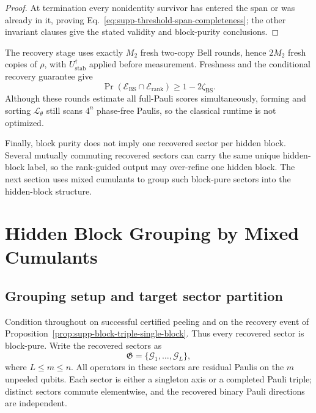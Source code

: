 \documentclass[
  aps,
  prx,
  reprint,
  superscriptaddress,
  amsmath,
  amssymb,
  nofootinbib,
  longbibliography
]{revtex4-2}
\begin{document}
\begin{proof}
At termination every nonidentity survivor has entered the span or was already
in it, proving Eq.~\eqref{eq:supp-threshold-span-completeness}; the other
invariant clauses give the stated validity and block-purity conclusions.
\end{proof}




The recovery stage uses exactly $M_2$ fresh two-copy Bell rounds, hence
$2M_2$ fresh copies of $\rho$, with $U_{\mathrm{stab}}^\dagger$ applied
before measurement.  Freshness and the conditional recovery guarantee give
\begin{equation}
\Pr(\mathcal E_{\mathrm{BS}}\cap\mathcal E_{\mathrm{rank}})
\ge
1-2\zeta_{\mathrm{BS}}.
\end{equation}
Although these rounds estimate all full-Pauli scores simultaneously,
forming and sorting $\mathcal L_\theta$ still scans $4^n$ phase-free
Paulis, so the classical runtime is not optimized.

Finally, block purity does not imply one recovered sector per hidden block.
Several mutually commuting recovered sectors can carry the same unique
hidden-block label, so the rank-guided output may over-refine one hidden
block.  The next section uses mixed cumulants to group such block-pure
sectors into the hidden-block structure.






\section{Hidden Block Grouping by Mixed Cumulants}
\label{sec:supp-cumulant-grouping}

\subsection{Grouping setup and target sector partition}

Condition throughout on successful certified peeling and on the recovery
event of Proposition~\ref{prop:supp-block-triple-single-block}.  Thus every
recovered sector is block-pure.  Write the recovered sectors as
\begin{equation}
\mathfrak G=\{\mathcal G_1,\dots,\mathcal G_L\},
\end{equation}
where $L\le m\le n$.  All operators in these sectors are residual Paulis on
the $m$ unpeeled qubits.  Each sector is either a singleton axis or a
completed Pauli triple; distinct sectors commute elementwise, and the
recovered binary Pauli directions are independent.
\end{document}
